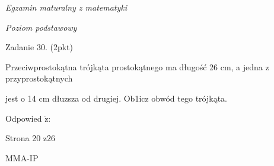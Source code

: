 \documentclass[a4paper,12pt]{article}
\begin{document}
{\it Egzamin maturalny z matematyki}

{\it Poziom podstawowy}

Zadanie 30. (2pkt)

Przeciwprostokątna trójkąta prostokątnego ma długość 26 cm, a jedna z przyprostokątnych

jest o 14 cm dłuzsza od drugiej. Ob1icz obwód tego trójkąta.

Odpowied $\acute{\mathrm{z}}$:

Strona 20 $\mathrm{z}26$

MMA-IP
\end{document}
